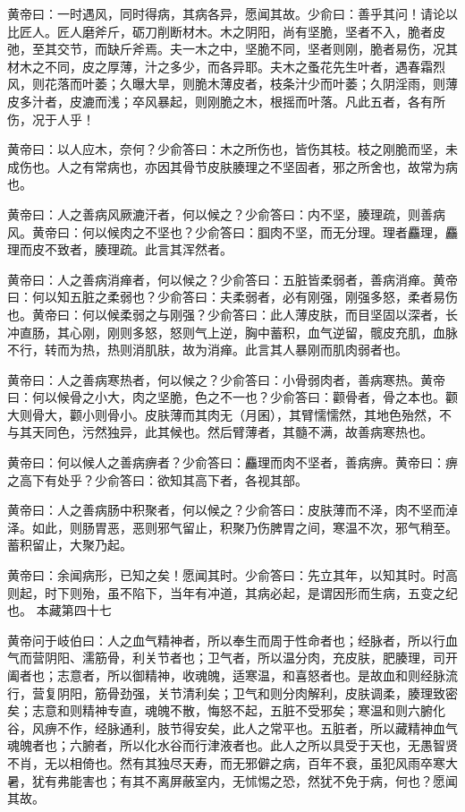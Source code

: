 \documentclass[a4paper,12pt,UTF8,twoside]{ctexbook}
\begin{document}
	黄帝曰：一时遇风，同时得病，其病各异，愿闻其故。少俞曰：善乎其问！请论以比匠人。匠人磨斧斤，砺刀削断材木。木之阴阳，尚有坚脆，坚者不入，脆者皮弛，至其交节，而缺斤斧焉。夫一木之中，坚脆不同，坚者则刚，脆者易伤，况其材木之不同，皮之厚薄，汁之多少，而各异耶。夫木之蚤花先生叶者，遇春霜烈风，则花落而叶萎；久曝大旱，则脆木薄皮者，枝条汁少而叶萎；久阴淫雨，则薄皮多汁者，皮漉而浅；卒风暴起，则刚脆之木，根摇而叶落。凡此五者，各有所伤，况于人乎！
	
	黄帝曰：以人应木，奈何？少俞答曰：木之所伤也，皆伤其枝。枝之刚脆而坚，未成伤也。人之有常病也，亦因其骨节皮肤腠理之不坚固者，邪之所舍也，故常为病也。
	
	黄帝曰：人之善病风厥漉汗者，何以候之？少俞答曰：内不坚，腠理疏，则善病风。黄帝曰：何以候肉之不坚也？少俞答曰：腘肉不坚，而无分理。理者麤理，麤理而皮不致者，腠理疏。此言其浑然者。
	
	黄帝曰：人之善病消瘅者，何以候之？少俞答曰：五脏皆柔弱者，善病消瘅。黄帝曰：何以知五脏之柔弱也？少俞答曰：夫柔弱者，必有刚强，刚强多怒，柔者易伤也。黄帝曰：何以候柔弱之与刚强？少俞答曰：此人薄皮肤，而目坚固以深者，长冲直肠，其心刚，刚则多怒，怒则气上逆，胸中蓄积，血气逆留，髋皮充肌，血脉不行，转而为热，热则消肌肤，故为消瘅。此言其人暴刚而肌肉弱者也。
	
	黄帝曰：人之善病寒热者，何以候之？少俞答曰：小骨弱肉者，善病寒热。黄帝曰：何以候骨之小大，肉之坚脆，色之不一也？少俞答曰：颧骨者，骨之本也。颧大则骨大，颧小则骨小。皮肤薄而其肉无（月囷），其臂懦懦然，其地色殆然，不与其天同色，污然独异，此其候也。然后臂薄者，其髓不满，故善病寒热也。
	
	黄帝曰：何以候人之善病痹者？少俞答曰：麤理而肉不坚者，善病痹。黄帝曰：痹之高下有处乎？少俞答曰：欲知其高下者，各视其部。
	
	黄帝曰：人之善病肠中积聚者，何以候之？少俞答曰：皮肤薄而不泽，肉不坚而淖泽。如此，则肠胃恶，恶则邪气留止，积聚乃伤脾胃之间，寒温不次，邪气稍至。蓄积留止，大聚乃起。
	
	黄帝曰：余闻病形，已知之矣！愿闻其时。少俞答曰：先立其年，以知其时。时高则起，时下则殆，虽不陷下，当年有冲道，其病必起，是谓因形而生病，五变之纪也。
	本藏第四十七
	
	黄帝问于岐伯曰：人之血气精神者，所以奉生而周于性命者也；经脉者，所以行血气而营阴阳、濡筋骨，利关节者也；卫气者，所以温分肉，充皮肤，肥腠理，司开阖者也；志意者，所以御精神，收魂魄，适寒温，和喜怒者也。是故血和则经脉流行，营复阴阳，筋骨劲强，关节清利矣；卫气和则分肉解利，皮肤调柔，腠理致密矣；志意和则精神专直，魂魄不散，悔怒不起，五脏不受邪矣；寒温和则六腑化谷，风痹不作，经脉通利，肢节得安矣，此人之常平也。五脏者，所以藏精神血气魂魄者也；六腑者，所以化水谷而行津液者也。此人之所以具受于天也，无愚智贤不肖，无以相倚也。然有其独尽天寿，而无邪僻之病，百年不衰，虽犯风雨卒寒大暑，犹有弗能害也；有其不离屏蔽室内，无怵惕之恐，然犹不免于病，何也？愿闻其故。
	
\end{document}
